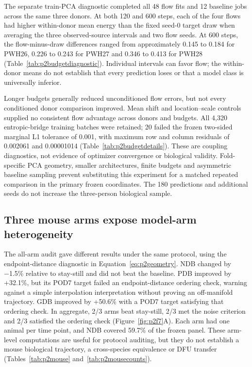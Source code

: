 \documentclass[10pt,a4paper]{article}
\begin{document}
The separate train-PCA diagnostic completed all 48 flow fits and 12 baseline jobs across the same three donors. At both 120 and 600 steps, each of the four flows had higher within-donor mean energy than the fixed seed-0 target draw when averaging the three observed-source intervals and two flow seeds. At 600 steps, the flow-minus-draw differences ranged from approximately 0.145 to 0.184 for PWH26, 0.226 to 0.243 for PWH27 and 0.346 to 0.413 for PWH28 (Table~\ref{tab:p2budgetdiagnostic}). Individual intervals can favor flow; the within-donor means do not establish that every prediction loses or that a model class is universally inferior.

Longer budgets generally reduced unconditioned flow errors, but not every conditioned donor comparison improved. Mean shift and location--scale controls supplied no consistent flow advantage across donors and budgets. All 4,320 entropic-bridge training batches were retained; 20 failed the frozen two-sided marginal L1 tolerance of 0.001, with maximum row and column residuals of 0.002061 and 0.00001014 (Table~\ref{tab:p2budgetdetails}). These are coupling diagnostics, not evidence of optimizer convergence or biological validity. Fold-specific PCA geometry, smaller architectures, finite budgets and asymmetric baseline sampling prevent substituting this experiment for a matched repeated comparison in the primary frozen coordinates. The 180 predictions and additional seeds do not increase the three-person biological sample.

\subsection{Three mouse arms expose model-arm heterogeneity}

The all-arm audit gave different results under the same protocol, using the endpoint-distance diagnostic in Equation~\eqref{eq:p2geometry}. NDB changed by −1.5\% relative to stay-still and did not beat the baseline. PDB improved by +32.1\%, but its POD7 target failed an endpoint-distance ordering check, warning against a simple interpolation interpretation without proving an off-manifold trajectory. GDB improved by +50.6\% with a POD7 target satisfying that ordering check. In aggregate, 2/3 arms beat stay-still, 2/3 met the noise criterion and 2/3 satisfied the ordering check (Figure~\ref{fig:p2f7}A\label{call:p2f7}). Each arm had one animal per time point, and NDB covered 59.7\% of the frozen panel. These arm-level computations are useful for protocol auditing, but they do not establish a mouse biological trajectory, a cross-species equivalence or DFU transfer (Tables~\ref{tab:p2mouse} and~\ref{tab:p2mousecounts}).
\end{document}
